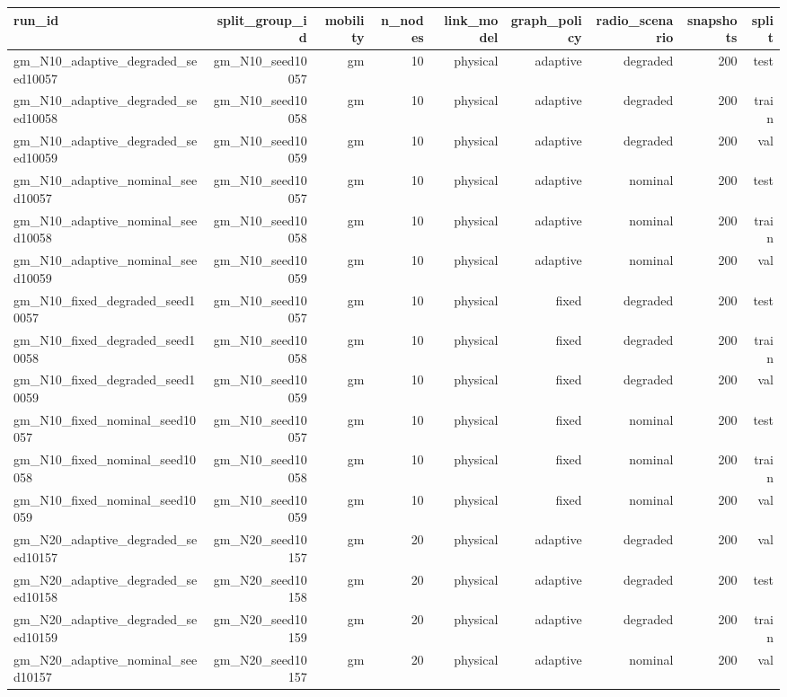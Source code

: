 \begin{tabular}{lrrrrrrrr}
\toprule
run\_id & split\_group\_id & mobility & n\_nodes & link\_model & graph\_policy & radio\_scenario & snapshots & split \\
\midrule
gm\_N10\_adaptive\_degraded\_seed10057 & gm\_N10\_seed10057 & gm & 10 & physical & adaptive & degraded & 200 & test \\
gm\_N10\_adaptive\_degraded\_seed10058 & gm\_N10\_seed10058 & gm & 10 & physical & adaptive & degraded & 200 & train \\
gm\_N10\_adaptive\_degraded\_seed10059 & gm\_N10\_seed10059 & gm & 10 & physical & adaptive & degraded & 200 & val \\
gm\_N10\_adaptive\_nominal\_seed10057 & gm\_N10\_seed10057 & gm & 10 & physical & adaptive & nominal & 200 & test \\
gm\_N10\_adaptive\_nominal\_seed10058 & gm\_N10\_seed10058 & gm & 10 & physical & adaptive & nominal & 200 & train \\
gm\_N10\_adaptive\_nominal\_seed10059 & gm\_N10\_seed10059 & gm & 10 & physical & adaptive & nominal & 200 & val \\
gm\_N10\_fixed\_degraded\_seed10057 & gm\_N10\_seed10057 & gm & 10 & physical & fixed & degraded & 200 & test \\
gm\_N10\_fixed\_degraded\_seed10058 & gm\_N10\_seed10058 & gm & 10 & physical & fixed & degraded & 200 & train \\
gm\_N10\_fixed\_degraded\_seed10059 & gm\_N10\_seed10059 & gm & 10 & physical & fixed & degraded & 200 & val \\
gm\_N10\_fixed\_nominal\_seed10057 & gm\_N10\_seed10057 & gm & 10 & physical & fixed & nominal & 200 & test \\
gm\_N10\_fixed\_nominal\_seed10058 & gm\_N10\_seed10058 & gm & 10 & physical & fixed & nominal & 200 & train \\
gm\_N10\_fixed\_nominal\_seed10059 & gm\_N10\_seed10059 & gm & 10 & physical & fixed & nominal & 200 & val \\
gm\_N20\_adaptive\_degraded\_seed10157 & gm\_N20\_seed10157 & gm & 20 & physical & adaptive & degraded & 200 & val \\
gm\_N20\_adaptive\_degraded\_seed10158 & gm\_N20\_seed10158 & gm & 20 & physical & adaptive & degraded & 200 & test \\
gm\_N20\_adaptive\_degraded\_seed10159 & gm\_N20\_seed10159 & gm & 20 & physical & adaptive & degraded & 200 & train \\
gm\_N20\_adaptive\_nominal\_seed10157 & gm\_N20\_seed10157 & gm & 20 & physical & adaptive & nominal & 200 & val \\

\end{tabular}

